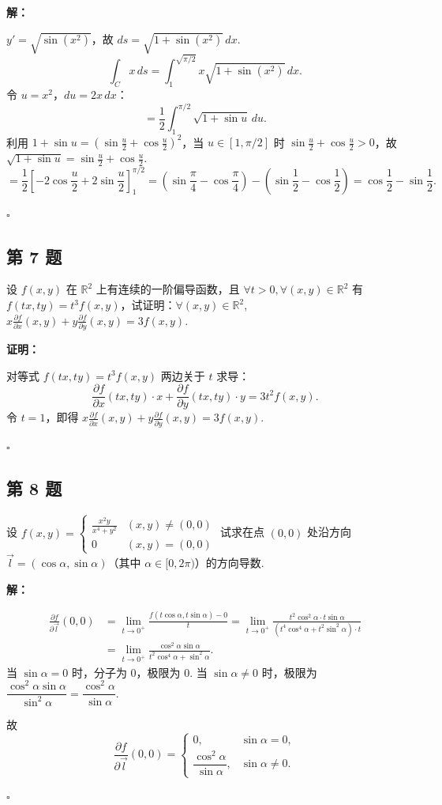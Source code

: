 \documentclass[12pt,a4paper]{article}
\newenvironment{sol}[1][解]{%
  \par\medskip\noindent\textbf{#1：}\itshape\par\noindent\ignorespaces
}{%
  \par\hfill$\square$\par\medskip
}
\begin{document}
\begin{sol}$y'=\sqrt{\sin(x^2)}$，故 $ds=\sqrt{1+\sin(x^2)}\,dx$.
  $$\int_C x\,ds=\int_1^{\sqrt{\pi/2}}x\sqrt{1+\sin(x^2)}\,dx.$$
  令 $u=x^2$，$du=2x\,dx$：
  $$=\frac{1}{2}\int_1^{\pi/2}\sqrt{1+\sin u}\,du.$$
  利用 $1+\sin u=(\sin\frac{u}{2}+\cos\frac{u}{2})^2$，当 $u\in[1,\pi/2]$ 时
  $\sin\frac{u}{2}+\cos\frac{u}{2}>0$，故 $\sqrt{1+\sin
  u}=\sin\frac{u}{2}+\cos\frac{u}{2}$.
  $$=\frac{1}{2}\left[-2\cos\frac{u}{2}+2\sin\frac{u}{2}\right]_1^{\pi/2}=(\sin\frac{\pi}{4}-\cos\frac{\pi}{4})-(\sin\frac{1}{2}-\cos\frac{1}{2})=\cos\frac{1}{2}-\sin\frac{1}{2}.$$

\end{sol}
\subsection*{第 7 题}
设 $f(x,y)$ 在 $\mathbb{R}^2$ 上有连续的一阶偏导函数，且 $\forall t>0,
\forall(x,y)\in\mathbb{R}^2$ 有
$f(tx,ty)=t^3f(x,y)$，试证明：$\forall(x,y)\in\mathbb{R}^2$,
$x\frac{\partial f}{\partial x}(x,y)+y\frac{\partial f}{\partial
y}(x,y)=3f(x,y)$.

\begin{sol}[证明]对等式 $f(tx,ty)=t^3f(x,y)$ 两边关于 $t$ 求导：
  $$\frac{\partial f}{\partial x}(tx,ty)\cdot x+\frac{\partial
  f}{\partial y}(tx,ty)\cdot y=3t^2f(x,y).$$
  令 $t=1$，即得 $x\frac{\partial f}{\partial x}(x,y)+y\frac{\partial
  f}{\partial y}(x,y)=3f(x,y).$
\end{sol}
\subsection*{第 8 题}
设 $f(x,y)=
\begin{cases}\frac{x^2y}{x^4+y^2} & (x,y)\ne(0,0) \\ 0 & (x,y)=(0,0)
\end{cases}$ 试求在点 $(0,0)$ 处沿方向 $\vec{l}=(\cos\alpha,\sin\alpha)$（其中
$\alpha\in[0,2\pi)$）的方向导数.

\begin{sol}
  \begin{align*}
    \frac{\partial f}{\partial\vec{l}}(0,0)&=\lim_{t\to
    0^+}\frac{f(t\cos\alpha,t\sin\alpha)-0}{t}
    =\lim_{t\to 0^+}\frac{t^2\cos^2\alpha\cdot
    t\sin\alpha}{(t^4\cos^4\alpha+t^2\sin^2\alpha)\cdot t}\\
    &=\lim_{t\to
    0^+}\frac{\cos^2\alpha\sin\alpha}{t^2\cos^4\alpha+\sin^2\alpha}.
  \end{align*}
  当 $\sin\alpha=0$ 时，分子为 0，极限为 $0$.
  当 $\sin\alpha\ne 0$ 时，极限为
  $\dfrac{\cos^2\alpha\sin\alpha}{\sin^2\alpha}=\dfrac{\cos^2\alpha}{\sin\alpha}.$

  故 $$\frac{\partial f}{\partial\vec{l}}(0,0)=
  \begin{cases}0, & \sin\alpha=0,\\ \dfrac{\cos^2\alpha}{\sin\alpha}, &
    \sin\alpha\ne 0.
  \end{cases}$$

\end{sol}
\end{document}
